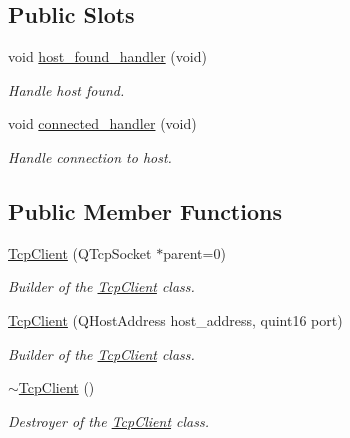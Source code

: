 \subsection*{Public Slots}
\begin{DoxyCompactItemize}
\item 
void \mbox{\hyperlink{class_tcp_client_a2c1b8363f05d55bc06335f8da4c7fc8e}{host\+\_\+found\+\_\+handler}} (void)
\begin{DoxyCompactList}\small\item\em Handle host found. \end{DoxyCompactList}\item 
void \mbox{\hyperlink{class_tcp_client_a2467855310250aad604efaabfdccb55c}{connected\+\_\+handler}} (void)
\begin{DoxyCompactList}\small\item\em Handle connection to host. \end{DoxyCompactList}\end{DoxyCompactItemize}
\subsection*{Public Member Functions}
\begin{DoxyCompactItemize}
\item 
\mbox{\hyperlink{class_tcp_client_adde22f7475a79d89eca8107fd9223405}{Tcp\+Client}} (Q\+Tcp\+Socket $\ast$parent=0)
\begin{DoxyCompactList}\small\item\em Builder of the \mbox{\hyperlink{class_tcp_client}{Tcp\+Client}} class. \end{DoxyCompactList}\item 
\mbox{\hyperlink{class_tcp_client_a27a11b182cec604367594ae040e042a8}{Tcp\+Client}} (Q\+Host\+Address host\+\_\+address, quint16 port)
\begin{DoxyCompactList}\small\item\em Builder of the \mbox{\hyperlink{class_tcp_client}{Tcp\+Client}} class. \end{DoxyCompactList}\item 
\mbox{\hyperlink{class_tcp_client_a125d2277f401cbdebadb9689a5933e18}{$\sim$\+Tcp\+Client}} ()
\begin{DoxyCompactList}\small\item\em Destroyer of the \mbox{\hyperlink{class_tcp_client}{Tcp\+Client}} class. \end{DoxyCompactList}\end{DoxyCompactItemize}
